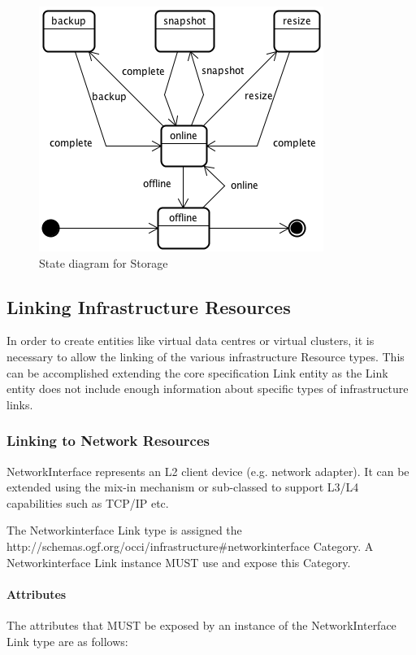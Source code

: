 \documentclass[10pt,a4paper]{article}
\begin{document}
\begin{figure}[!h]
	\centering
	\includegraphics[scale=0.4]{figs/storage-state.png}
	\caption{State diagram for Storage}
	\label{fig:storage_state}
\end{figure}

\subsection{Linking Infrastructure Resources}
In order to create entities like virtual data centres or virtual clusters, it is necessary to allow the linking of the various infrastructure Resource types. This can be accomplished extending the core specification Link entity as the Link entity does not include enough information about specific types of infrastructure links.

\subsubsection{Linking to Network Resources}
NetworkInterface represents an L2 client device (e.g. network adapter). It can be extended using the mix-in mechanism or sub-classed to support L3/L4 capabilities such as TCP/IP etc. 

The Networkinterface Link type is assigned the http://schemas.ogf.org/occi/infrastructure\#networkinterface Category. A Networkinterface Link instance MUST use and expose this Category.

\paragraph{Attributes}
The attributes that MUST be exposed by an instance of the NetworkInterface Link type are as follows:
\end{document}
